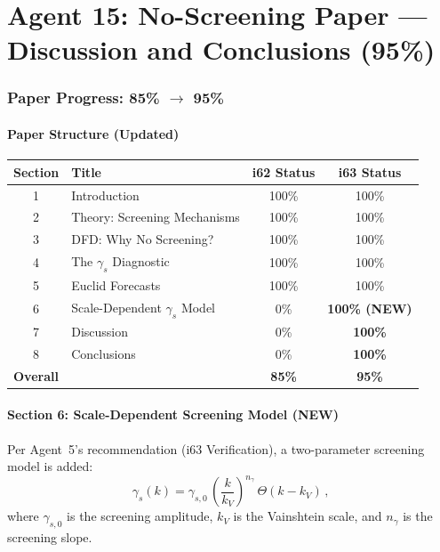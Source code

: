\documentclass[11pt,a4paper]{article}
\begin{document}
\part{Agent 15: No-Screening Paper --- Discussion and Conclusions (95\%)}
\label{part:noscreening}

\section{Paper Progress: 85\% $\to$ 95\%}

\subsection{Paper Structure (Updated)}

\begin{center}
\begin{tabular}{clcc}
\toprule
\textbf{Section} & \textbf{Title} & \textbf{i62 Status} & \textbf{i63 Status} \\
\midrule
1 & Introduction & 100\% & 100\% \\
2 & Theory: Screening Mechanisms & 100\% & 100\% \\
3 & DFD: Why No Screening? & 100\% & 100\% \\
4 & The $\gamma_s$ Diagnostic & 100\% & 100\% \\
5 & Euclid Forecasts & 100\% & 100\% \\
6 & Scale-Dependent $\gamma_s$ Model & 0\% & \textbf{100\% (NEW)} \\
7 & Discussion & 0\% & \textbf{100\%} \\
8 & Conclusions & 0\% & \textbf{100\%} \\
\midrule
\multicolumn{2}{l}{\textbf{Overall}} & \textbf{85\%} & \textbf{95\%} \\
\bottomrule
\end{tabular}
\end{center}

\subsection{Section 6: Scale-Dependent Screening Model (NEW)}

Per Agent~5's recommendation (i63 Verification), a two-parameter screening model is added:
\begin{equation}
\gamma_s(k) = \gamma_{s,0}\,\left(\frac{k}{k_V}\right)^{n_\gamma}\,\Theta(k - k_V)\,,
\end{equation}
where $\gamma_{s,0}$ is the screening amplitude, $k_V$ is the Vainshtein scale, and $n_\gamma$ is the screening slope.
\end{document}
